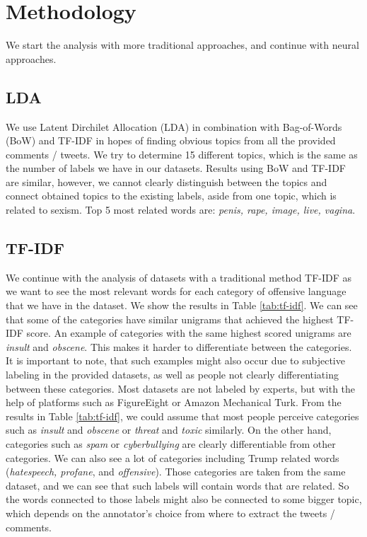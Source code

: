 \documentclass[fleqn,moreauthors,10pt]{ds_report}
\begin{document}
\section*{Methodology}
We start the analysis with more traditional approaches, and continue with neural approaches.

\subsection*{LDA}
We use Latent Dirchilet Allocation (LDA) in combination with Bag-of-Words (BoW) and TF-IDF in hopes of finding obvious topics from all the provided comments / tweets. We try to determine 15 different topics, which is the same as the number of labels we have in our datasets. Results using BoW and TF-IDF are similar, however, we cannot clearly distinguish between the topics and connect obtained topics to the existing labels, aside from one topic, which is related to sexism. Top 5 most related words are: \textit{penis, rape, image, live, vagina}.

\subsection*{TF-IDF}
We continue with the analysis of datasets with a traditional method TF-IDF as we want to see the most relevant words for each category of offensive language that we have in the dataset. We show the results in Table \ref{tab:tf-idf}. We can see that some of the categories have similar unigrams that achieved the highest TF-IDF score. An example of categories with the same highest scored unigrams are \textit{insult} and \textit{obscene}. This makes it harder to differentiate between the categories. It is important to note, that such examples might also occur due to subjective labeling in the provided datasets, as well as people not clearly differentiating between these categories. Most datasets are not labeled by experts, but with the help of platforms such as FigureEight or Amazon Mechanical Turk. From the results in Table \ref{tab:tf-idf}, we could assume that most people perceive categories such as \textit{insult} and \textit{obscene} or \textit{threat} and \textit{toxic} similarly. On the other hand, categories such as \textit{spam} or \textit{cyberbullying} are clearly differentiable from other categories. We can also see a lot of categories including Trump related words (\textit{hatespeech, profane}, and \textit{offensive}). Those categories are taken from the same dataset, and we can see that such labels will contain words that are related. So the words connected to those labels might also be connected to some bigger topic, which depends on the annotator's choice from where to extract the tweets / comments.
\end{document}
